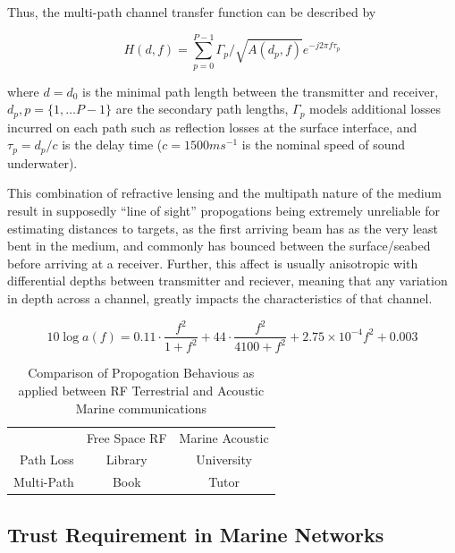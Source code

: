\documentclass[runningheads,a4paper]{llncs}
\begin{document}
Thus, the multi-path channel transfer function can be described by 

\begin{equation}
  \label{eq:acomultipath}
  H(d,f) = \sum_{p=0}^{P-1} \Gamma_p / \sqrt{A(d_p,f)}e^{-j 2 \pi f \tau_p}
\end{equation}

where $d=d_0$ is the minimal path length between the transmitter and receiver, $d_p,p=\{1,\dots P-1\}$ are the secondary path lengths, $\Gamma_p$ models additional losses incurred on each path such as reflection losses at the surface interface, and $\tau_p = d_p/c$ is the delay time ($c = 1500 ms^{-1}$ is the nominal speed of sound underwater).


This combination of refractive lensing and the multipath nature of the medium  result in supposedly ``line of sight'' propogations being extremely unreliable for estimating distances to targets, as the first arriving beam has as the very least bent in the medium, and commonly has bounced between the surface/seabed before arriving at a receiver. Further, this affect is usually anisotropic with differential depths between transmitter and reciever, meaning that any variation in depth across a channel, greatly impacts the characteristics of that channel.

\begin{equation}
  \label{eq:thorp}
  10 \log a(f) = 0.11 \cdot \frac{f^2}{1+f^2} + 44\cdot\frac{f^2}{4100+f^2}+ 2.75\times10^{-4} f^2 + 0.003
\end{equation}

\begin{table}[h]
  \caption{Comparison of Propogation Behavious as applied between RF Terrestrial and Acoustic Marine communications} \label{tab:propconstraints}
  \begin{center}
    \begin{tabular}{ r|c|c| }
      \multicolumn{1}{r}{}
      &  \multicolumn{1}{c}{Free Space RF}
      & \multicolumn{1}{c}{Marine Acoustic} \\
      \cline{2-3}
      Path Loss & Library & University \\
      \cline{2-3}
      Multi-Path & Book & Tutor \\
      \cline{2-3}
    \end{tabular}
  \end{center}
\end{table}

\subsection{Trust Requirement in Marine Networks}
\end{document}
